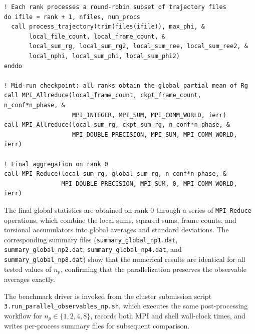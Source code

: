 \begin{lstlisting}[caption={Round-robin file distribution and MPI checkpoint in \texttt{main\_parallel\_observables.f90}.}]
! Each rank processes a round-robin subset of trajectory files
do ifile = rank + 1, nfiles, num_procs
  call process_trajectory(trim(files(ifile)), max_phi, &
       local_file_count, local_frame_count, &
       local_sum_rg, local_sum_rg2, local_sum_ree, local_sum_ree2, &
       local_nphi, local_sum_phi, local_sum_phi2)
enddo

! Mid-run checkpoint: all ranks obtain the global partial mean of Rg
call MPI_Allreduce(local_frame_count, ckpt_frame_count, n_conf*n_phase, &
                   MPI_INTEGER, MPI_SUM, MPI_COMM_WORLD, ierr)
call MPI_Allreduce(local_sum_rg, ckpt_sum_rg, n_conf*n_phase, &
                   MPI_DOUBLE_PRECISION, MPI_SUM, MPI_COMM_WORLD, ierr)

! Final aggregation on rank 0
call MPI_Reduce(local_sum_rg, global_sum_rg, n_conf*n_phase, &
                MPI_DOUBLE_PRECISION, MPI_SUM, 0, MPI_COMM_WORLD, ierr)
\end{lstlisting}

The final global statistics are obtained on rank 0 through a series of
\texttt{MPI\_Reduce} operations, which combine the local sums, squared sums,
frame counts, and torsional accumulators into global averages and standard
deviations. The corresponding summary files
(\texttt{summary\_global\_np1.dat}, \texttt{summary\_global\_np2.dat},
\texttt{summary\_global\_np4.dat}, and \texttt{summary\_global\_np8.dat}) show
that the numerical results are identical for all tested values of \(n_p\),
confirming that the parallelization preserves the observable averages exactly.

The benchmark driver is invoked from the cluster submission script
\texttt{3.run\_parallel\_observables\_np.sh}, which executes the same
post-processing workflow for \(n_p \in \{1,2,4,8\}\), records both MPI and
shell wall-clock times, and writes per-process summary files for subsequent
comparison.

